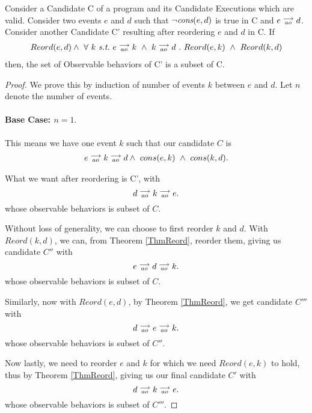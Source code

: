\begin{corollary}
    \label{CorollReord}
    Consider a Candidate C of a program and its Candidate Executions which are valid. Consider two events $e$ and $d$ such that $\neg \textit{cons}(e,d)$ is true in C and $e\stackrel{\longrightarrow}{_{ao}}d$. 
    Consider another Candidate C' resulting after reordering $e$ and $d$ in C. 
    If
    \begin{align*}
        Reord(e,d) \wedge \ 
        \forall \ k \ \textit{s.t.} \ 
        \reln{e}{ao}{k} \ \wedge \ \reln{k}{ao}{d} \ . \ 
        Reord(e,k) \ \wedge \ Reord(k,d)    
    \end{align*}
    then, the set of Observable behaviors of C' is a subset of C. 
    \label{corol1}
\end{corollary}
    
\begin{proof}
    We prove this by induction of number of events $k$ between $e$ and $d$. Let $n$ denote the number of events.

    \paragraph{Base Case: $n = 1.$}
        This means we have one event $k$ such that our candidate $C$ is
        \begin{align*}
            \reln{e}{ao}{\reln{k}{ao}{d}} \wedge \ cons(e,k) \ \wedge \ cons(k,d).
        \end{align*}
                
        What we want after reordering is C', with
        \[
            d\stackrel{\longrightarrow}{_{ao}}k\stackrel{\longrightarrow}{_{ao}}e. 
        \]
        whose observable behaviors is subset of $C$.

        Without loss of generality, we can choose to first reorder $k$ and $d$. With $Reord(k,d)$, we can, from Theorem \ref{ThmReord}, reorder them, giving us candidate $C''$ with
        \[
            e\stackrel{\longrightarrow}{_{ao}}d\stackrel{\longrightarrow}{_{ao}}k. 
        \]
        whose observable behaviors is subset of $C$.

        Similarly, now with $Reord(e,d)$, by Theorem \ref{ThmReord}, we get candidate $C'''$ with 
        \[
            d\stackrel{\longrightarrow}{_{ao}}e\stackrel{\longrightarrow}{_{ao}}k. 
        \]
        whose observable behaviors is subset of $C''$.

        Now lastly, we need to reorder $e$ and $k$ for which we need $Reord(e,k)$ to hold, thus by Theorem \ref{ThmReord}, giving us our final candidate $C'$ with
        \[
            d\stackrel{\longrightarrow}{_{ao}}k\stackrel{\longrightarrow}{_{ao}}e.
        \]
        whose observable behaviors is subset of $C'''$.


\end{proof}
